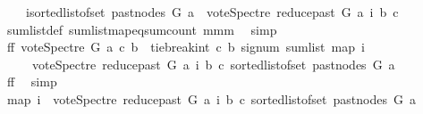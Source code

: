 \begin{isabellebody}
\ \ \ \ {\isacharparenleft}{\kern0pt}{\isasymSum}i{\isasymleftarrow}sorted{\isacharunderscore}{\kern0pt}list{\isacharunderscore}{\kern0pt}of{\isacharunderscore}{\kern0pt}set\ {\isacharparenleft}{\kern0pt}past{\isacharunderscore}{\kern0pt}nodes\ G\ a{\isacharparenright}{\kern0pt}{\isachardot}{\kern0pt}\ {\isacharminus}{\kern0pt}\ vote{\isacharunderscore}{\kern0pt}Spectre\ {\isacharparenleft}{\kern0pt}reduce{\isacharunderscore}{\kern0pt}past\ G\ a{\isacharparenright}{\kern0pt}\ i\ b\ c{\isacharparenright}{\kern0pt}{\isachardoublequoteclose}\isanewline
\ \ \ \ \ \ \isamarkupfalse%
\ sum{\isacharunderscore}{\kern0pt}list{\isacharunderscore}{\kern0pt}def\ sum{\isacharunderscore}{\kern0pt}list{\isacharunderscore}{\kern0pt}map{\isacharunderscore}{\kern0pt}eq{\isacharunderscore}{\kern0pt}sum{\isacharunderscore}{\kern0pt}count\ mmm\ \isamarkupfalse%
\ simp\isanewline
\ \ \ \ \isamarkupfalse%
\ \isamarkupfalse%
\ ff{}{\isacharcolon}{\kern0pt}\ {\isachardoublequoteopen}vote{\isacharunderscore}{\kern0pt}Spectre\ G\ a\ c\ b\ {\isacharequal}{\kern0pt}\ tie{\isacharunderscore}{\kern0pt}break{\isacharunderscore}{\kern0pt}int\ c\ b\ {\isacharparenleft}{\kern0pt}signum\ {\isacharparenleft}{\kern0pt}sum{\isacharunderscore}{\kern0pt}list\ {\isacharparenleft}{\kern0pt}map\ {\isacharparenleft}{\kern0pt}{\isasymlambda}i{\isachardot}{\kern0pt}\isanewline
\ \ \ \ {\isacharparenleft}{\kern0pt}{\isacharminus}{\kern0pt}\ vote{\isacharunderscore}{\kern0pt}Spectre\ {\isacharparenleft}{\kern0pt}reduce{\isacharunderscore}{\kern0pt}past\ G\ a{\isacharparenright}{\kern0pt}\ i\ b\ c{\isacharparenright}{\kern0pt}{\isacharparenright}{\kern0pt}\ {\isacharparenleft}{\kern0pt}sorted{\isacharunderscore}{\kern0pt}list{\isacharunderscore}{\kern0pt}of{\isacharunderscore}{\kern0pt}set\ {\isacharparenleft}{\kern0pt}past{\isacharunderscore}{\kern0pt}nodes\ G\ a{\isacharparenright}{\kern0pt}{\isacharparenright}{\kern0pt}{\isacharparenright}{\kern0pt}{\isacharparenright}{\kern0pt}{\isacharparenright}{\kern0pt}{\isachardoublequoteclose}\ \isanewline
\ \ \ \ \ \ \isamarkupfalse%
\ ff{}\ \isamarkupfalse%
\ simp\ \ \ \ \ \ \ \isanewline
\ \ \ \ \isamarkupfalse%
\ {\isachardoublequoteopen}{\isacharparenleft}{\kern0pt}map\ {\isacharparenleft}{\kern0pt}{\isasymlambda}i{\isachardot}{\kern0pt}\ {\isacharminus}{\kern0pt}\ vote{\isacharunderscore}{\kern0pt}Spectre\ {\isacharparenleft}{\kern0pt}reduce{\isacharunderscore}{\kern0pt}past\ G\ a{\isacharparenright}{\kern0pt}\ i\ b\ c{\isacharparenright}{\kern0pt}\ {\isacharparenleft}{\kern0pt}sorted{\isacharunderscore}{\kern0pt}list{\isacharunderscore}{\kern0pt}of{\isacharunderscore}{\kern0pt}set\ {\isacharparenleft}{\kern0pt}past{\isacharunderscore}{\kern0pt}nodes\ G\ a{\isacharparenright}{\kern0pt}{\isacharparenright}{\kern0pt}{\isacharparenright}{\kern0pt}\isanewline

\end{isabellebody}
